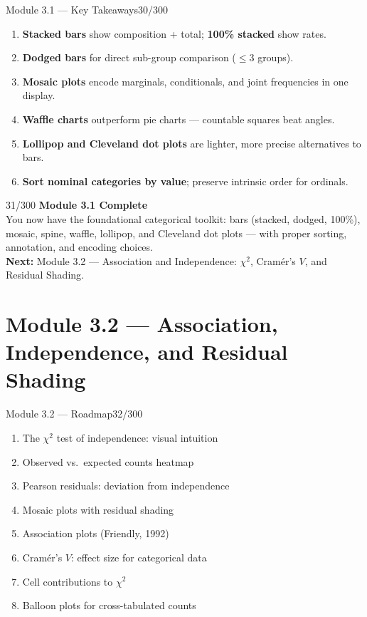 \documentclass[10pt]{beamer}
\newcommand{\smark}[1]{\hfill{\scriptsize\color{codegray}#1}}
\begin{document}
\begin{frame}{Module 3.1 --- Key Takeaways}\smark{30/300}
\begin{enumerate}
    \item \textbf{Stacked bars} show composition + total; \textbf{100\% stacked} show rates.
    \item \textbf{Dodged bars} for direct sub-group comparison ($\leq 3$ groups).
    \item \textbf{Mosaic plots} encode marginals, conditionals, and joint frequencies in one display.
    \item \textbf{Waffle charts} outperform pie charts --- countable squares beat angles.
    \item \textbf{Lollipop and Cleveland dot plots} are lighter, more precise alternatives to bars.
    \item \textbf{Sort nominal categories by value}; preserve intrinsic order for ordinals.
\end{enumerate}
\end{frame}

\begin{frame}{}\smark{31/300}
\centering\vspace{1.5cm}
{\Large\textbf{Module 3.1 Complete}}\\[0.5cm]
You now have the foundational categorical toolkit: bars (stacked, dodged, 100\%), mosaic, spine, waffle, lollipop, and Cleveland dot plots --- with proper sorting, annotation, and encoding choices.\\[0.5cm]
\textbf{Next:} Module 3.2 --- Association and Independence: $\chi^2$, Cramér's $V$, and Residual Shading.
\end{frame}

\section{Module 3.2 --- Association, Independence, and Residual Shading}

\begin{frame}{Module 3.2 --- Roadmap}\smark{32/300}
\begin{enumerate}
    \item The $\chi^2$ test of independence: visual intuition
    \item Observed vs.\ expected counts heatmap
    \item Pearson residuals: deviation from independence
    \item Mosaic plots with residual shading
    \item Association plots (Friendly, 1992)
    \item Cramér's $V$: effect size for categorical data
    \item Cell contributions to $\chi^2$
    \item Balloon plots for cross-tabulated counts
\end{enumerate}
\end{frame}
\end{document}
